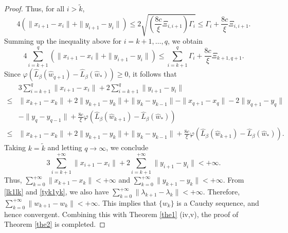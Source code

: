 \documentclass[pdflatex,sn-mathphys-num]{sn-jnl}%
\theoremstyle{thmstyleone}%
\theoremstyle{thmstyletwo}%
\theoremstyle{thmstylethree}%
\begin{document}
\begin{proof}
Thus, for all $i>\tilde{k}$,
\[
4(\|{x}_{i+1}-x_{i}\|+\|{y}_{i+1}-y_{i}\|)\leq 2\sqrt{(\frac{8c}{\xi}\Xi_{i,i+1})\Gamma_i}\leq \Gamma_i+\frac{8c}{\xi}\Xi_{i,i+1}.
\]
Summing up the inequality above for $i=k+1, \dots, q$, we obtain
\[
4\sum_{i={k}+1}^{q} (\|{x}_{i+1}-x_{i}\|+\|{y}_{i+1}-y_{i}\|)\leq \sum_{i={k}+1}^{q} \Gamma_i+\frac{8c}{\xi}\Xi_{{k}+1,q+1}.
\]
Since $\varphi(\hat{L}_{\beta}(\hat{w}_{q+1})-\hat{L}_{\beta}(\hat{w}_{*}))\geq 0$, it follows that
\begin{align}
&3\sum_{i={k}+1}^{q}\|{x}_{i+1}-x_{i}\|+2\sum_{i={k}+1}^{q}\|{y}_{i+1}-y_{i}\|\nonumber\\
\leq & \|{x}_{{k}+1}-x_{{k}}\|+2\|{y}_{{k}+1}-y_{{k}}\|+\|{y}_{{k}}-y_{{k}-1}\|-\|{x}_{q+1}-x_{q}\|-2\|{y}_{q+1}-y_{q}\|\nonumber\\
& -\|{y}_{q}-y_{q-1}\|+\frac{8c}{\xi}\varphi(\hat{L}_{\beta}(\hat{w}_{{k}+1})-\hat{L}_{\beta}(\hat{w}_{*}))\nonumber\\
\leq& \|{x}_{{k}+1}-x_{{k}}\|+2\|{y}_{{k}+1}-y_{{k}}\|+\|{y}_{{k}}-y_{{k}-1}\| +\frac{8c}{\xi}\varphi(\hat{L}_{\beta}(\hat{w}_{{k}+1})-\hat{L}_{\beta}(\hat{w}_{*})).\label{sumxy}
\end{align}
Taking $k=\tilde{k}$ and letting $q\to\infty$, we conclude
\[3\sum_{i={k}+1}^{+\infty}\|{x}_{i+1}-x_{i}\|+2\sum_{i={k}+1}^{+\infty}\|{y}_{i+1}-y_{i}\|<+\infty.\]
Thus, $\sum_{k=0}^{+\infty} \|{x}_{k+1}-x_{k}\|<+\infty$ and $\sum_{k=0}^{+\infty} \|{y}_{k+1}-y_{k}\|<+\infty$. From \eqref{lk1lk} and \eqref{tyk1yk}, we also have $\sum_{k=0}^{+\infty} \|{\lambda}_{k+1}-\lambda_{k}\|<+\infty$. Therefore, $\sum_{k=0}^{+\infty} \|{w}_{k+1}-w_{k}\| <+\infty$.
This implies that $\{w_k\}$ is a Cauchy sequence, and hence convergent. Combining this with Theorem \ref{the1} (iv,v), the proof of Theorem \ref{the2} is completed.
\end{proof}
\end{document}
